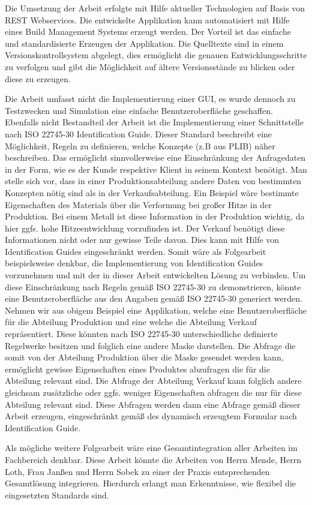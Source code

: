 Die Umsetzung der Arbeit erfolgte mit Hilfe aktueller Technologien auf Basis von \gls{REST} \glspl{Webservice}. Die entwickelte Applikation kann automatisiert mit Hilfe eines Build Management Systems erzeugt werden. Der Vorteil ist das einfache und standardisierte Erzeugen der Applikation. Die Quelltexte sind in einem Versionskontrollsystem abgelegt, dies ermöglicht die genauen Entwicklungsschritte zu verfolgen und gibt die Möglichkeit auf ältere Versionsstände zu blicken oder diese zu erzeugen. 

Die Arbeit umfasst nicht die Implementierung einer GUI, es wurde dennoch zu Testzwecken und Simulation eine einfache Benutzeroberfläche geschaffen. Ebenfalls nicht Bestandteil der Arbeit ist die Implementierung einer Schnittstelle nach ISO 22745-30 Identification Guide. Dieser Standard beschreibt eine Möglichkeit, Regeln zu definieren, welche Konzepte (z.B aus \gls{PLIB}) näher beschreiben. Das ermöglicht sinnvollerweise eine Einschränkung der Anfragedaten in der Form, wie es der Kunde respektive Klient in seinem Kontext benötigt. Man stelle sich vor, dass in einer Produktionsabteilung andere Daten von bestimmten Konzepten nötig sind als in der Verkaufsabteilung. Ein Beispiel wäre bestimmte Eigenschaften des Materials über die Verformung bei großer Hitze in der Produktion. Bei einem Metall ist diese Information in der Produktion wichtig, da hier ggfs. hohe Hitzeentwicklung vorzufinden ist. Der Verkauf benötigt diese Informationen nicht oder nur gewisse Teile davon. Dies kann mit Hilfe von Identification Guides eingeschränkt werden. 
Somit wäre als Folgearbeit beispielsweise denkbar, die Implementierung von Identification Guides vorzunehmen und mit der in dieser Arbeit entwickelten Lösung zu verbinden. Um diese Einschränkung nach Regeln gemäß ISO 22745-30 zu demonstrieren, könnte eine Benutzeroberfläche aus den Angaben gemäß ISO 22745-30 generiert werden. Nehmen wir aus obigem Beispiel eine Applikation, welche eine Benutzeroberfläche für die Abteilung Produktion und eine welche die Abteilung Verkauf repräsentiert. Diese könnten nach ISO 22745-30 unterschiedliche definierte Regelwerke besitzen und folglich eine andere Maske darstellen. Die Abfrage die somit von der Abteilung Produktion über die Maske gesendet werden kann, ermöglicht gewisse Eigenschaften eines Produktes abzufragen die für die Abteilung relevant sind. Die Abfrage der Abteilung Verkauf kann folglich andere gleichsam zusätzliche oder ggfs. weniger Eigenschaften abfragen die nur für diese Abteilung relevant sind. Diese Abfragen werden dann eine Abfrage gemäß dieser Arbeit erzeugen, eingeschränkt gemäß des dynamisch erzeugtem Formular nach Identification Guide. 

Als mögliche weitere Folgearbeit wäre eine Gesamtintegration aller Arbeiten im Fachbereich denkbar. Diese Arbeit könnte die Arbeiten von Herrn Mende, Herrn Loth, Frau Janßen und Herrn Sobek zu einer der Praxis entsprechenden Gesamtlösung integrieren. Hierdurch erlangt man Erkenntnisse, wie flexibel die eingesetzten Standards sind.  
